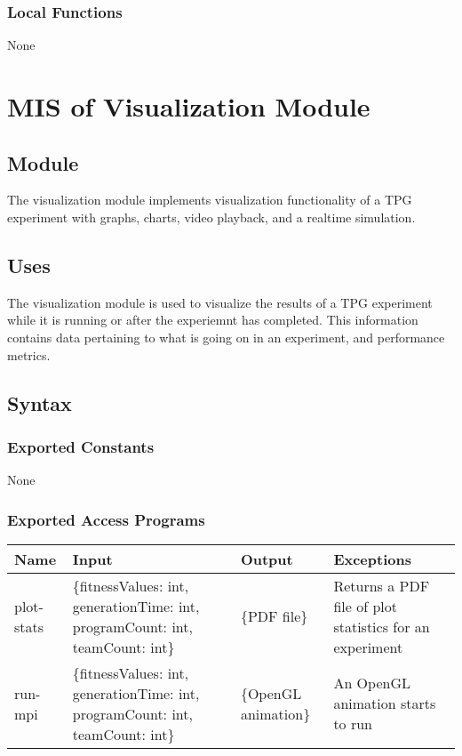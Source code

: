 \documentclass[12pt, titlepage]{article}
\begin{document}
\subsubsection{Local Functions}
None

\section{MIS of Visualization Module} \label{Visualization Module}

\subsection{Module}
The visualization module implements visualization functionality of a TPG experiment with graphs, charts, video playback, and a realtime simulation.

\subsection{Uses}
The visualization module is used to visualize the results of a TPG experiment while it is running or after the experiemnt has completed. This information contains data pertaining to what is going on in an experiment, and performance metrics.

\subsection{Syntax}

\subsubsection{Exported Constants}
None

\subsubsection{Exported Access Programs}
\begin{center}
  \begin{tabular}{p{2cm} p{4cm} p{4cm} p{4cm}}
  \hline
  \textbf{Name} & \textbf{Input} & \textbf{Output} & \textbf{Exceptions} \\
  \hline
  plot-stats & \{fitnessValues: int, generationTime: int, programCount: int, teamCount: int\} & \{PDF file\} & Returns a PDF file of plot statistics for an experiment \\
  \hline
  run-mpi & \{fitnessValues: int, generationTime: int, programCount: int, teamCount: int\} & \{OpenGL animation\} & An OpenGL animation starts to run \\
  \hline
  
  \end{tabular}
  
  \end{center}
\end{document}
